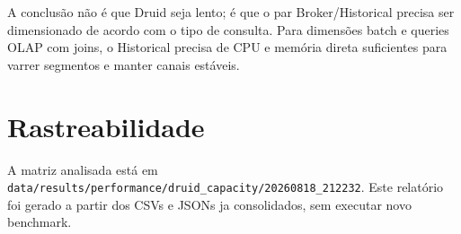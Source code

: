 \documentclass[11pt,a4paper]{article}
\begin{document}
A conclusão não é que Druid seja lento; é que o par Broker/Historical precisa ser dimensionado de acordo com o tipo de consulta. Para dimensões batch e queries OLAP com joins, o Historical precisa de CPU e memória direta suficientes para varrer segmentos e manter canais estáveis.

\section{Rastreabilidade}

A matriz analisada está em \texttt{data/results/performance/druid\_capacity/20260818\_212232}. Este relatório foi gerado a partir dos CSVs e JSONs ja consolidados, sem executar novo benchmark.
\end{document}
